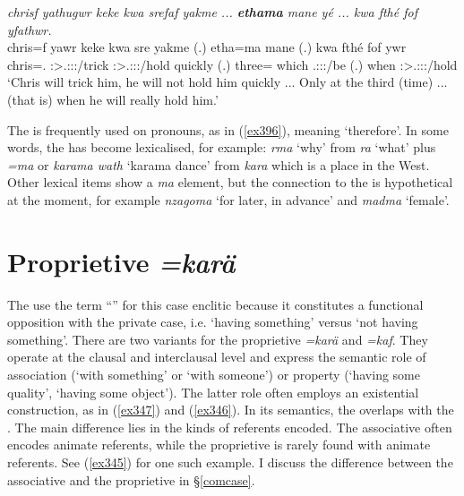 \begin{exe}
	\ex \emph{chrisf yathugwr keke kwa srefaf yakme ... \textbf{ethama} mane yé ... kwa fthé fof yfathwr.}\\
	\gll chris=f yawr keke kwa sre yakme (.) etha=ma mane  (.) kwa fthé fof ywr\\
	chris=\Erg.{\Sg} \Stsg:\Sbj>\Tsg.\Masc:\Obj:\Nonpast:\Ipfv/trick {\Neg} {\Fut} \Stsg:\Sbj>\Tsg.\Masc:\Obj:\Irr:\Pfv/hold quickly (.) three={\Char} which \Tsg.\Masc:\Sbj:\Nonpast:\Ipfv/be (.) {\Fut} when {\Emph} \Stsg:\Sbj>\Tsg.\Masc:\Obj:\Nonpast:\Ipfv/hold\\
	\trans `Chris will trick him, he will not hold him quickly ... Only at the third (time) ... (that is) when he will really hold him.'
	\label{ex402}
\end{exe}

The   is frequently used on  pronouns, as in (\ref{ex396}), meaning `therefore'. In some words, the   has become lexicalised, for example: \emph{rma} `why' from \emph{ra} `what' plus \emph{=ma} or \emph{karama wath} `karama dance' from \emph{kara} which is a place in the West. Other lexical items show a \emph{ma} element, but the connection to the   is hypothetical at the moment, for example \emph{nzagoma} `for later, in advance' and \emph{madma} `female'.

\section{Proprietive \emph{=karä}} \label{propcase}

The use the term ``'' for this case enclitic because it constitutes a functional opposition with the private case, i.e. `having something' versus `not having something'. There are two variants for the proprietive \emph{=karä} and \emph{=kaf}. They operate at the clausal and interclausal level and express the semantic role of association (`with something' or `with someone') or property (`having some quality', `having some object'). The latter role often employs an existential construction, as in (\ref{ex347}) and (\ref{ex346}). In its semantics, the  overlaps with the  . The main difference lies in the kinds of referents encoded. The associative often encodes animate referents, while the proprietive is rarely found with animate referents. See (\ref{ex345}) for one such example. I discuss the difference between the associative and the proprietive in {\S}\ref{comcase}.

